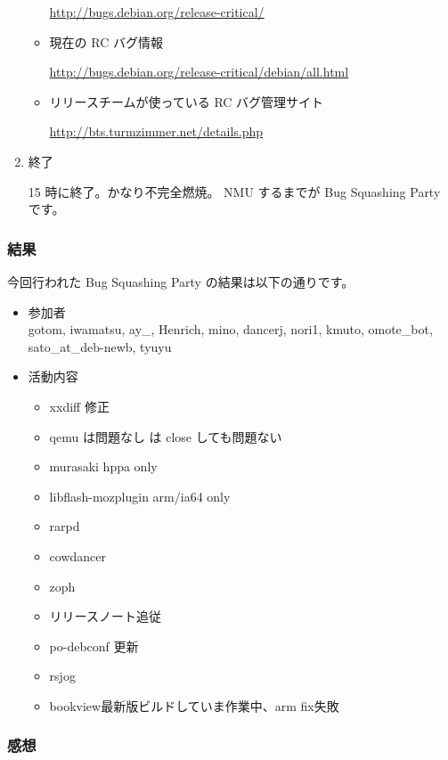 \documentclass[mingoth,a4paper]{jsarticle}
\begin{document}
\begin{enumerate}
\begin{itemize}
	\url{http://bugs.debian.org/release-critical/}
  \item 現在の RC バグ情報 
	
	\url{http://bugs.debian.org/release-critical/debian/all.html}
  \item リリースチームが使っている RC バグ管理サイト 
	
\url{http://bts.turmzimmer.net/details.php}
 \end{itemize}
\item 終了

 15 時に終了。かなり不完全燃焼。
 NMU するまでが Bug Squashing Party です。

\end{enumerate}

\subsubsection{結果}
 今回行われた Bug Squashing Party の結果は以下の通りです。

\begin{itemize}
 \item 参加者\\
 gotom,
 iwamatsu,
 ay\_,
 Henrich,
 mino,
 dancerj,
 nori1,
 kmuto,
 omote\_bot,
 sato\_at\_deb-newb,
 tyuyu

 \item 活動内容
   \begin{itemize}
   \item xxdiff 修正 
   \item qemu は問題なし は close しても問題ない
   \item murasaki  hppa only
   \item libflash-mozplugin  arm/ia64 only
   \item rarpd 
   \item cowdancer 
   \item zoph 
   \item リリースノート追従
   \item po-debconf 更新
   \item rsjog
   \item bookview最新版ビルドしていま作業中、arm fix失敗
   \end{itemize}
\end{itemize}

\subsubsection{感想}
\end{document}
